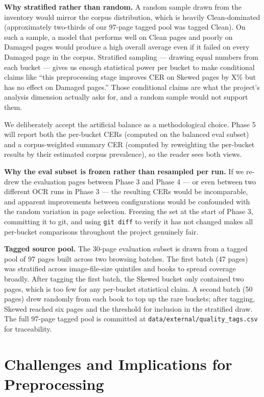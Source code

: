 \documentclass[
  letterpaper,
  DIV=11,
  numbers=noendperiod]{scrartcl}
\begin{document}
\textbf{Why stratified rather than random.} A random sample drawn from
the inventory would mirror the corpus distribution, which is heavily
Clean-dominated (approximately two-thirds of our 97-page tagged pool was
tagged Clean). On such a sample, a model that performs well on Clean
pages and poorly on Damaged pages would produce a high overall average
even if it failed on every Damaged page in the corpus. Stratified
sampling --- drawing equal numbers from each bucket --- gives us enough
statistical power per bucket to make conditional claims like ``this
preprocessing stage improves CER on Skewed pages by X\% but has no
effect on Damaged pages.'' Those conditional claims are what the
project's analysis dimension actually asks for, and a random sample
would not support them.

We deliberately accept the artificial balance as a methodological
choice. Phase 5 will report both the per-bucket CERs (computed on the
balanced eval subset) and a corpus-weighted summary CER (computed by
reweighting the per-bucket results by their estimated corpus
prevalence), so the reader sees both views.

\textbf{Why the eval subset is frozen rather than resampled per run.} If
we re-drew the evaluation pages between Phase 3 and Phase 4 --- or even
between two different OCR runs in Phase 3 --- the resulting CERs would
be incomparable, and apparent improvements between configurations would
be confounded with the random variation in page selection. Freezing the
set at the start of Phase 3, committing it to git, and using
\texttt{git\ diff} to verify it has not changed makes all per-bucket
comparisons throughout the project genuinely fair.

\textbf{Tagged source pool.} The 30-page evaluation subset is drawn from
a tagged pool of 97 pages built across two browsing batches. The first
batch (47 pages) was stratified across image-file-size quintiles and
books to spread coverage broadly. After tagging the first batch, the
Skewed bucket only contained two pages, which is too few for any
per-bucket statistical claim. A second batch (50 pages) drew randomly
from each book to top up the rare buckets; after tagging, Skewed reached
six pages and the threshold for inclusion in the stratified draw. The
full 97-page tagged pool is committed at
\texttt{data/external/quality\_tags.csv} for traceability.

\section{Challenges and Implications for
Preprocessing}\label{challenges-and-implications-for-preprocessing}
\end{document}
